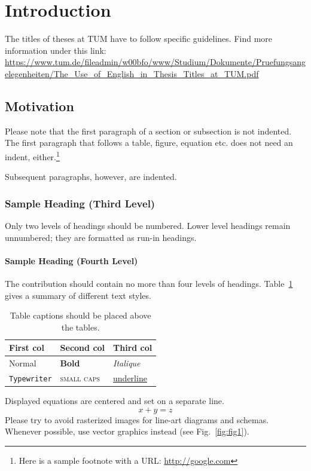 \section{Introduction}
\label{sec:intro}
The titles of theses at TUM have to follow specific guidelines.
Find more information under this link:
\url{https://www.tum.de/fileadmin/w00bfo/www/Studium/Dokumente/Pruefungsangelegenheiten/The_Use_of_English_in_Thesis_Titles_at_TUM.pdf}

\subsection{Motivation}
\label{subsec:motivation}

Please note that the first paragraph of a section or subsection is not indented.
The first paragraph that follows a table, figure, equation etc.
does not need an indent, either.\footnote{Here is a sample footnote with a URL: \url{http://google.com}}

Subsequent paragraphs, however, are indented.

\subsubsection{Sample Heading (Third Level)} Only two levels of
headings should be numbered.
Lower level headings remain unnumbered; they are formatted as run-in headings.

\paragraph{Sample Heading (Fourth Level)}
The contribution should contain no more than four levels of headings. 
Table~\ref{tab:tab1} gives a summary of different text styles.

\begin{table}
\caption{Table captions should be placed above the
tables.}\label{tab:tab1}
\centering
\begin{tabular}{|l|l|l|}
\hline
First col &  Second col & Third col\\
\hline
Normal & \textbf{Bold} & \textit{Italique}\\
\texttt{Typewriter} & \textsc{small caps} & \underline{underline}\\
\hline
\end{tabular}
\end{table}


\noindent Displayed equations are centered and set on a separate
line.
\begin{equation}
x + y = z\label{eq:equation}
\end{equation}
Please try to avoid rasterized images for line-art diagrams and schemas. 
Whenever possible, use vector graphics instead (see Fig.~\ref{fig:fig1}).

